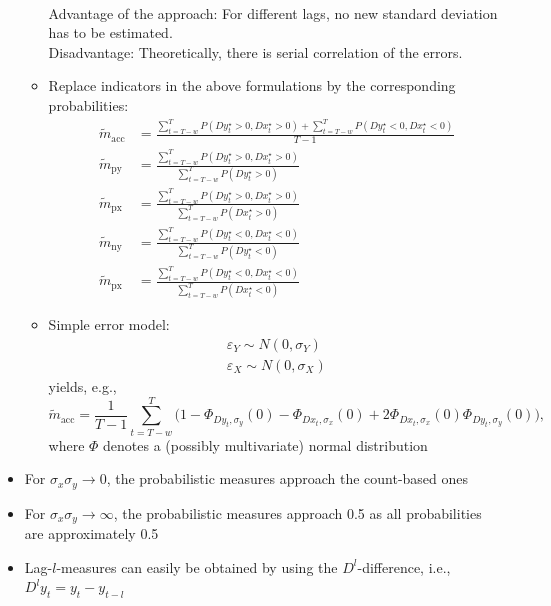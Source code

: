 \documentclass[oneside]{article}
\theoremstyle{plain}%
\theoremstyle{definition}
\newcommand{\ydiff}{D y}
\newcommand{\ydifft}{Dy^\star}
\newcommand{\xdiff}{Dx}
\newcommand{\xdifft}{Dx^\star}
\newcommand{\Prob}[1]{P(#1)}
\newcommand{\mprob}{\tilde{m}}
\begin{document}
\begin{itemize}
\begin{itemize}
\begin{align}
 \end{align}
 Advantage of the approach: For different lags, no new standard deviation has to be estimated.\\
 Disadvantage: Theoretically, there is serial correlation of the errors.
\item  Replace indicators in the above formulations by the corresponding probabilities:
\begin{align}
		\mprob_{\text{acc}} &= \frac{\sum_{t=T-w}^T \Prob{ \ydifft_t > 0, \xdifft_t > 0} + \sum_{t=T-w}^T \Prob{\ydifft_t < 0, \xdifft_t < 0}}{T-1}  \\
   \mprob_{\text{py}} &= \frac{\sum_{t=T-w}^T \Prob{\ydifft_t > 0, \xdifft_t > 0}}{\sum_{t=T-w}^T \Prob{\ydifft_t > 0}} \\
    \mprob_{\text{px}} &= \frac{\sum_{t=T-w}^T \Prob{\ydifft_t > 0, \xdifft_t > 0}}{\sum_{t=T-w}^T \Prob{\xdifft_t > 0}} \\
    \mprob_{\text{ny}} &= \frac{\sum_{t=T-w}^T \Prob{\ydifft_t < 0, \xdifft_t < 0}}{\sum_{t=T-w}^T \Prob{\ydifft_t < 0}} \\
    \mprob_{\text{px}} &= \frac{\sum_{t=T-w}^T \Prob{\ydifft_t < 0, \xdifft_t < 0}}{\sum_{t=T-w}^T \Prob{\xdifft_t < 0}} 
\end{align} 
\item Simple error model:
  \begin{align}
	  \varepsilon_Y \sim N(0, \sigma_Y) \\
	  \varepsilon_X \sim N(0, \sigma_X)
  \end{align}
  yields, e.g.,
  	\begin{equation}
  		\mprob_{\text{acc}} = \frac{1}{T-1} \sum_{t=T-w}^T  \big( 1 - \Phi_{\ydiff_t, \sigma_y}(0) - \Phi_{\xdiff_t, \sigma_x} (0) + 2 \Phi_{\xdiff_t,\sigma_x}( 0)\Phi_{\ydiff_t,\sigma_y}( 0) \big), 
	\end{equation}
	where $\Phi$ denotes a (possibly multivariate) normal distribution
\end{itemize}
\item For $\sigma_x \sigma_y \rightarrow 0$, the probabilistic measures approach the count-based ones
\item For $\sigma_x \sigma_y \rightarrow \infty$, the probabilistic measures approach 0.5 as all probabilities are approximately 0.5
\item Lag-$l$-measures can easily be obtained by using the $D^l$-difference, i.e., $D^l y_t = y_t - y_{t-l}$
\end{itemize}
\end{document}
